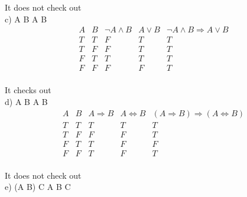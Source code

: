 \documentclass{article}
\begin{document}
It does not check out\\


c) \: \neg A \wedge B \models A \vee B\\


\begin{displaymath}
\begin{array}{|c|c|c|c|c|c}

A & 
B & 
\neg A \wedge B & 
A \vee B & \neg A \wedge B \Rightarrow A \vee B\\ %
\hline  %
T & T & F & T & T\\
T & F & F & T & T\\
F & T & T & T & T\\
F & F & F & F & T\\

\end{array}
\end{displaymath}

It checks out\\


d) \: A \Rightarrow B \models A \Leftrightarrow B\\


\begin{displaymath}
\begin{array}{|c|c|c|c|c|c}

A & 
B & 
A \Rightarrow B & 
A \Leftrightarrow B & 
(A \Rightarrow B) \Rightarrow (A \Leftrightarrow B)\\ %
\hline  %
T & T & T & T & T\\
T & F & F & F & T\\
F & T & T & F & F\\
F & F & T & F & T\\

\end{array}
\end{displaymath}

It does not check out\\

e) \: (A \Rightarrow B) \Leftrightarrow C \models A \vee  \neg B \vee C\\
\end{document}
